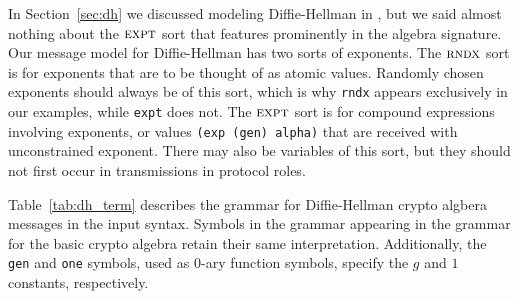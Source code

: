  In Section~\ref{sec:dh} we discussed modeling
Diffie-Hellman in {\cpsa}, but we said almost nothing about the
$\scap{expt}$ sort that features prominently in the algebra signature.
Our message model for Diffie-Hellman has two sorts of exponents.  The
$\scap{rndx}$ sort is for exponents that are to be thought of as
atomic values.  Randomly chosen exponents should always be of this
sort, which is why \texttt{rndx} appears exclusively in our examples,
while \texttt{expt} does not.  The $\scap{expt}$ sort is for compound
expressions involving exponents, or values \texttt{(exp (gen) alpha)}
that are received with unconstrained exponent.  There may also be
variables of this sort, but they should not first occur in
transmissions in protocol roles.

Table~\ref{tab:dh_term} describes the grammar for Diffie-Hellman
crypto algbera messages in the input syntax.  Symbols in the grammar
appearing in the grammar for the basic crypto algebra retain their
same interpretation.  Additionally, the \texttt{gen} and \texttt{one}
symbols, used as 0-ary function symbols, specify the $g$ and $1$
constants, respectively.

